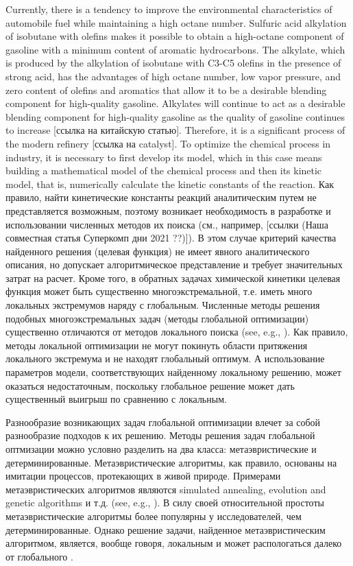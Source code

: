 \documentclass{svproc}
\begin{document}
Currently, there is a tendency to improve the environmental characteristics of automobile fuel while maintaining a high octane number. Sulfuric acid alkylation of isobutane with olefins makes it possible to obtain a high-octane component of gasoline with a minimum content of aromatic hydrocarbons. The alkylate, which is produced by the alkylation of isobutane with C3-C5 olefins in the presence of strong acid, has the advantages of high octane number, low vapor pressure, and zero content of olefins and aromatics that allow it to be a desirable blending component for high-quality gasoline. Alkylates will continue to act as a desirable blending component for high-quality gasoline as the quality of gasoline continues to increase [ссылка на китайскую статью]. Therefore, it is a significant process of the modern refinery [ссылка на catalyst]. To optimize the chemical process in industry, it is necessary to first develop its model, which in this case means building a mathematical model of the chemical process and then its kinetic model, that is, numerically calculate the kinetic constants of the reaction. 
Как правило, найти кинетические константы реакций аналитическим путем не представляется возможным, поэтому возникает необходимость в разработке и использовании численных методов их поиска (см., например, [ссылки (Наша совместная статья Суперкомп дни 2021 ??)]). В этом случае критерий качества найденного решения (целевая функция) не имеет явного аналитического описания, но допускает алгоритмическое представление и требует значительных затрат на расчет. Кроме того, в обратных задачах химической кинетики целевая функция может быть существенно многоэкстремальной, т.е. иметь много локальных экстремумов наряду с глобальным. 
Численные методы решения подобных многоэкстремальных задач (методы глобальной оптимизации) существенно отличаются от методов локального поиска (see, e.g., \cite{Sergeyev2017,PaulaviciusZilinskas2014}). Как правило, методы локальной оптимизации не могут покинуть области притяжения локального экстремума и не находят глобальный оптимум. А использование параметров модели, соответствующих найденному локальному решению, может оказаться недостаточным, поскольку глобальное решение может дать существенный выигрыш по сравнению с локальным. 

Разнообразие возникающих задач глобальной оптимизации влечет за собой разнообразие подходов к их решению.
Методы решения задач глобальной оптмизации можно условно разделить на два класса: метаэвристические и детерминированные. Метаэвристические алгоритмы, как правило, основаны на имитации процессов, протекающих в живой природе.
Примерами метаэвристических алгоритмов являются simulated annealing, evolution and genetic algorithms и т.д. (see, e.g., \cite{Battiti2009,Eiben2015}). В силу своей относительной простоты метаэвристические алгоритмы более популярны у исследователей, чем детерминированные.  Однако решение задачи, найденное метаэвристическим алгоритмом, является, вообще говоря, локальным и может распологаться далеко от глобального \cite{Kvasov2018}. 
\end{document}
